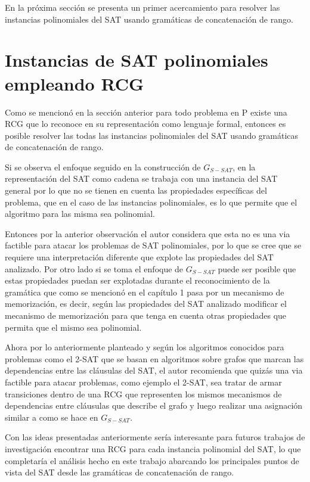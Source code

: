 \documentclass[12pt]{article}
\begin{document}
En la próxima sección se presenta un primer acercamiento para resolver las instancias polinomiales del SAT usando gramáticas
de concatenación de rango.

\section{Instancias de SAT polinomiales empleando RCG}

Como se mencionó en la sección anterior para todo problema en P existe una RCG que lo reconoce en su representación
como lenguaje formal, entonces es posible resolver las todas las instancias polinomiales del SAT usando gramáticas de concatenación
de rango.

Si se observa el enfoque seguido en la construcción de $G_{S-SAT}$, en la representación del SAT como cadena se
trabaja con una instancia del SAT general por lo que no se tienen en cuenta las propiedades específicas del problema,
que en el caso de las instancias polinomiales, es lo que permite que el algoritmo para las misma sea polinomial.

Entonces por la anterior observación el autor considera que esta no es una via factible para atacar los problemas
de SAT polinomiales, por lo que se cree que se requiere una interpretación diferente que explote las propiedades del
SAT analizado. Por otro lado si se toma el enfoque de $G_{S-SAT}$ puede ser posible que estas propiedades puedan ser
explotadas durante el reconocimiento de la gramática que como se mencionó en el capítulo 1 pasa por un mecanismo de
memorización, es decir, según las propiedades del SAT analizado modificar el mecanismo de memorización para que tenga
en cuenta otras propiedades que permita que el mismo sea polinomial.

Ahora por lo anteriormente planteado y según los algoritmos conocidos para problemas como el 2-SAT que se basan
en algoritmos sobre grafos que marcan las dependencias entre las cláusulas del SAT, el autor recomienda que quizás
una via factible para atacar problemas, como ejemplo el 2-SAT, sea tratar de armar transiciones dentro de una RCG
que representen los mismos mecanismos de dependencias entre cláusulas que describe el grafo y luego realizar una asignación
similar a como se hace en $G_{S-SAT}$.

Con las ideas presentadas anteriormente sería interesante para futuros trabajos de investigación encontrar una RCG para cada
instancia polinomial del SAT, lo que completaría el análisis hecho en este trabajo abarcando los principales puntos de
vista del SAT desde las gramáticas de concatenación de rango.
\end{document}
